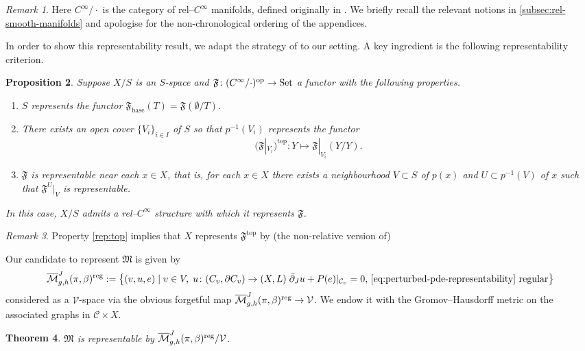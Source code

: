 \documentclass[11pt,psamsfonts, oneside, reqno]{amsart}
\newcommand{\set}[1]{\left\{ #1 \right\}}
\newcommand{\sub}{\subset}%
\newcommand{\inv}{^{-1}}
\newcommand{\cl}{\colon}
\newcommand{\emst}{\emptyset}
\newcommand{\iI}{_{i \in I}}
\newcommand{\reg}{\normalfont\text{reg}}
\newcommand{\Set}{\normalfont\text{Set}}
\newcommand{\Mbar}{\overline{\mathcal M}}
\newcommand{\delbar}{\bar\partial}
\newcommand{\del}{\partial}
\newcommand{\cC}{\mathcal{C}}
\newcommand{\cV}{\mathcal{V}}
\newcommand{\fF}{\mathfrak{F}}
\newcommand{\fM}{\mathfrak{M}}
\newtheorem{theorem}{Theorem}[section]
\newtheorem{proposition}[theorem]{Proposition}
\theoremstyle{definition}
\theoremstyle{remark}
\newtheorem{remark}[theorem]{Remark}
\numberwithin{equation}{section}
\begin{document}
\begin{remark}\label{} Here $C^\infty/\cdot$ is the category of rel--$C^\infty$ manifolds, defined originally in \cite{Swa21}. We briefly recall the relevant notions in \textsection\ref{subsec:rel-smooth-manifolds} and apologise for the non-chronological ordering of the appendices.\end{remark}

\noindent
In order to show this representability result, we adapt the strategy of \cite{Swa21} to our setting. A key ingredient is the following representability criterion.

\begin{proposition}\cite[Proposition 2.16]{Swa21}\label{prop:rep-criterion}  Suppose $X/S$ is an $S$-space and $\fF\cl (C^\infty/\cdot)^{\text{op}}\to \Set$ a functor with the following properties.
	\begin{enumerate}[1),leftmargin=*]
		\item\label{rep:base} $S$ represents the functor $\fF_{\text{base}}(T) = \fF(\emst/T)$.
		\item\label{rep:top} There exists an open cover $\{V_i\}\iI$ of $S$ so that $p\inv(V_i)$ represents the functor $$(\fF|_{V_i})^{\text{top}}: Y\mapsto \fF|_{V_i}(Y/Y).$$ 
		\item\label{rep:locally} $\fF$ is representable near each $x \in X$, that is, for each $x\in X$ there exists a neighbourhood $V \sub S$ of $p(x)$ and $U\sub p\inv(V)$ of $x$ such that $\fF^U|_V$ is representable.
	\end{enumerate}
	In this case, $X/S$ admits a rel--$C^\infty$ structure with which it represents $\fF$.
\end{proposition}

\begin{remark}
	Property \eqref{rep:top} implies that $X$ represents $\fF^{\text{top}}$ by (the non-relative version of) \cite[Lemma 2.15(b)(1)]{Swa21}
\end{remark}

\noindent
Our candidate to represent $\fM$ is given by 
$$\Mbar_{g,h}^J(\pi,\beta)^{\reg} := \set{(v,u,e)\mid v \in V,\; u \cl (C_v,\del C_v) \to  (X,L)\;\delbar_J u + P(e)|_{\cC_v} = 0,\, \eqref{eq:perturbed-pde-representability} \text{ regular}}$$
considered as a $\cV$-space via the obvious forgetful map $\Mbar_{g,h}^J(\pi,\beta)^{\reg}\to \cV$. We endow it with the Gromov--Hausdorff metric on the associated graphs in $\cC\times X$.

\begin{theorem}\label{thm:representable} $\fM$ is representable by $\Mbar_{g,h}^J(\pi,\beta)^{\reg}/\cV$.
\end{theorem}
\end{document}
